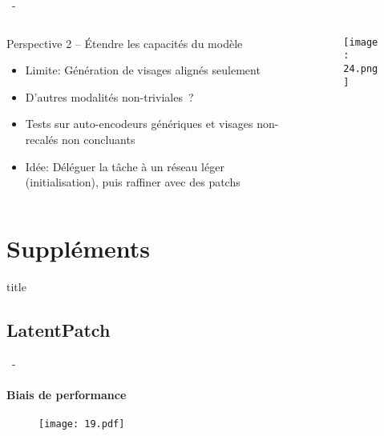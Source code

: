 \documentclass[aspectratio=169, 22pt]{beamer}
\begin{document}
\begin{frame}{\secname~- \subsecname}
  \begin{columns}
    \begin{column}{0.6\linewidth}
      \begin{block}{Perspective 2 – Étendre les capacités du modèle}        
        \begin{itemize}
        \item \alert{Limite}: Génération de visages alignés seulement
        \item D'autres modalités non-triviales ?

        \item Tests sur auto-encodeurs génériques et visages non-recalés non concluants
        \item \alert{Idée}: Déléguer la tâche à un réseau léger
          (initialisation), puis raffiner avec des patchs
        \end{itemize}
      \end{block}
    \end{column}
    \begin{column}{0.4\linewidth}
      \begin{figure}
        \centering
        \texttt{[image: 24.png]}
      \end{figure}
    \end{column}
  \end{columns}
\end{frame}


\makethanks

\section{Suppléments}
\begin{frame}[noframenumbering]
  \begin{beamercolorbox}[sep=15pt,center,shadow=true,rounded=true]{title}
    \LARGE\bfseries \secname
  \end{beamercolorbox}
\end{frame}


\subsection{LatentPatch}
\begin{frame}[noframenumbering]{\secname~- \subsecname}
  \framesubtitle{Biais de performance}
  \begin{figure}
    \centering
    \texttt{[image: 19.pdf]}
  \end{figure}
\end{frame}
\end{document}
